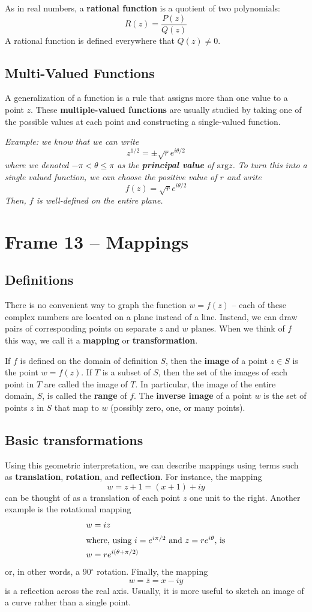 \documentclass{article}
\renewcommand{\emph}{\textbf}
\renewcommand{\bar}{\overline}
\begin{document}
As in real numbers, a \emph{rational function} is a quotient of two polynomials:
\[
	R(z) = \frac{P(z)}{Q(z)}
\]
A rational function is defined everywhere that $Q(z) \neq 0$. 


\subsection{Multi-Valued Functions}
A generalization of a function is a rule that assigns more than one value to a point $z$. These \emph{multiple-valued functions} are usually studied by taking one of the possible values at each point and constructing a single-valued function.

\textit{Example: we know that we can write
\[
	z^{1/2} = \pm \sqrt{r} e^{i\theta/2}
\]
where we denoted $-\pi < \theta \leq \pi$ as the \emph{principal value} of $\text{arg} z$. To turn this into a single valued function, we can choose the positive value of $r$ and write
\[
	f(z) = \sqrt{r} e^{i\theta / 2}
\]
Then, $f$ is well-defined on the entire plane.
}


\clearpage
\section{Frame 13 -- Mappings}
\subsection{Definitions}
There is no convenient way to graph the function $w = f(z)$ -- each of these complex numbers are located on a plane instead of a line. Instead, we can draw pairs of corresponding points on separate $z$ and $w$ planes. When we think of $f$ this way, we call it a \emph{mapping} or \emph{transformation}.

If $f$ is defined on the domain of definition $S$, then the \emph{image} of a point $z \in S$ is the point $w = f(z)$. If $T$ is a subset of $S$, then the set of the images of each point in $T$ are called the image of $T$. In particular, the image of the entire domain, $S$, is called the \emph{range} of $f$. The \emph{inverse image} of a point $w$ is the set of points $z$ in $S$ that map to $w$ (possibly zero, one, or many points).

\subsection{Basic transformations}
Using this geometric interpretation, we can describe mappings using terms such as \emph{translation}, \emph{rotation}, and \emph{reflection}. For instance, the mapping
\[
	w = z + 1 = (x + 1) + iy
\]
can be thought of as a translation of each point $z$ one unit to the right. Another example is the rotational mapping
\begin{align*}
	w &= iz \\
\intertext{where, using $i = e^{i\pi/2}$ and $z = re^{i\theta}$, is}
	w &= r e^{i(\theta + \pi/2)}
\end{align*}
or, in other words, a 90$^\circ$ rotation. Finally, the mapping
\[
	w = \bar{z} = x - iy
\]
is a reflection across the real axis. Usually, it is more useful to sketch an image of a curve rather than a single point. 
\end{document}
